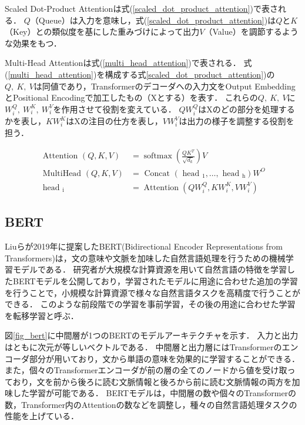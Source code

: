\documentclass[12pt,a4j]{jreport}
\begin{document}
Scaled Dot-Product Attentionは式(\ref{scaled_dot_product_attention})で表される．
$Q$（Queue）は入力を意味し，式(\ref{scaled_dot_product_attention})は$Q$と$K$（Key）との類似度を基にした重みづけによって出力$V$（Value）を調節するような効果をもつ．

Multi-Head Attentionは式(\ref{multi_head_attention})で表される．
式(\ref{multi_head_attention})を構成する式\ref{scaled_dot_product_attention})の$Q,~ K,~ V$は同値であり，Transformerのデコーダへの入力文をOutput EmbeddingとPositional Encodingで加工したもの（Xとする）を表す．
これらの$Q,~ K,~ V$に$W_i^Q,~ W_i^K,~ W_i^V$を作用させて役割を変えている．
$QW_i^Q$はXのどの部分を処理するかを表し，$KW_i^K$はXの注目の仕方を表し，$VW_i^V$は出力の様子を調整する役割を担う．

\begin{align}
  \text { Attention }(Q, K, V) &= \operatorname{softmax}\left(\frac{Q K^{T}}{\sqrt{d_{k}}}\right) V
  \label{scaled_dot_product_attention}
  \\
  \text { MultiHead }(Q, K, V) &=\text { Concat }\left(\text { head }_{1}, \ldots, \text { head }_{\mathrm{h}}\right) W^{O}
  \label{multi_head_attention}
  \\
  \text { head }_{\mathrm{i}} &=\operatorname{Attention}\left(Q W_{i}^{Q}, K W_{i}^{K}, V W_{i}^{V}\right)
  \label{substituted_scaled_dot_product_attention}
\end{align}


\subsection{BERT}
Liuらが2019年に提案したBERT(Bidirectional Encoder Representations from Transformers)は，文の意味や文脈を加味した自然言語処理を行うための機械学習モデルである\cite{aurellen20}\cite{devlin_bert_2019}．
研究者が大規模な計算資源を用いて自然言語の特徴を学習したBERTモデルを公開しており，学習されたモデルに用途に合わせた追加の学習を行うことで，小規模な計算資源で様々な自然言語タスクを高精度で行うことができる．
このような前段階での学習を事前学習，その後の用途に合わせた学習を転移学習と呼ぶ．

図\ref{fig_bert}に中間層が1つのBERTのモデルアーキテクチャを示す．
入力と出力はともに次元が等しいベクトルである．
中間層と出力層にはTransformerのエンコーダ部分が用いており，文から単語の意味を効果的に学習することができる．
また，個々のTransformerエンコーダが前の層の全てのノードから値を受け取っており，文を前から後ろに読む文脈情報と後ろから前に読む文脈情報の両方を加味した学習が可能である．
BERTモデルは，中間層の数や個々のTransformerの数，Transformer内のAttentionの数などを調整し，種々の自然言語処理タスクの性能を上げている．
\end{document}
